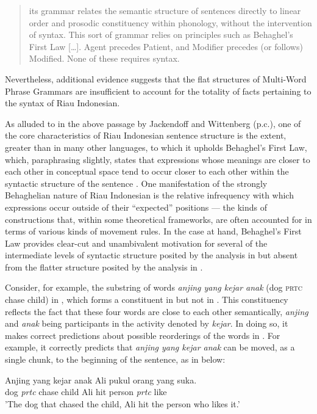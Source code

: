 \documentclass[output=paper,colorlinks,citecolor=brown
]{langscibook}
\begin{document}
\begin{quote}
      its grammar relates the semantic structure of sentences directly to linear order and
     prosodic constituency within phonology, without the intervention of syntax.  This sort of
     grammar relies on principles such as Behaghel’s First Law  [\ldots]. Agent precedes Patient, and
     Modifier precedes (or follows) Modified.  None of these requires syntax.
\end{quote}

Nevertheless, additional evidence suggests that the flat structures of Multi-Word Phrase Grammars are insufficient to account for the totality of facts pertaining to the syntax of Riau Indonesian.

As alluded to in the above passage by Jackendoff and Wittenberg (p.c.), one of the core characteristics of Riau Indonesian sentence structure is the extent, greater than in many other languages, to which it upholds Behaghel's First Law, which, paraphrasing slightly, states that expressions whose meanings are closer to each other in conceptual space tend to occur closer to each other within the syntactic structure of the sentence \citep{behaghel1932deutsche}.  One manifestation of the strongly Behaghelian nature of Riau Indonesian is the relative infrequency with which expressions occur outside of their ``expected'' positions — the kinds of constructions that, within some theoretical frameworks, are often accounted for in terms of various kinds of movement rules.  In the case at hand, Behaghel's First Law provides clear-cut and unambivalent motivation for several of the intermediate levels of syntactic structure posited by the analysis in  but absent from the flatter structure posited by the analysis in .

Consider, for example, the substring of words \textit{anjing yang kejar anak} (dog \textsc{prtc} chase child) in , which forms a constituent in  but not in .  This constituency reflects the fact that these four words are close to each other semantically, \textit{anjing} and \textit{anak} being participants in the activity denoted by \textit{kejar}.  In doing so, it makes correct predictions about possible reorderings of the words in .  For example, it correctly predicts that \textit{anjing yang kejar anak} can be moved, as a single chunk, to the beginning of the sentence, as in  below:

\ea \label{ex:gil:2}
\gll Anjing	yang	kejar	anak	Ali	pukul	orang	yang	suka.\\
 dog	\textit{prtc}	chase	child	Ali	hit	person	\textit{prtc}	like	\\
\glt 'The dog that chased the child, Ali hit the person who likes it.'
\z
\end{document}
